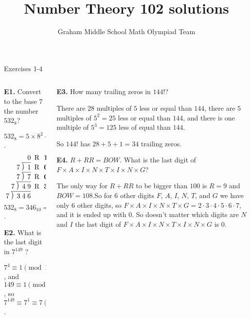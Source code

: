 \documentclass[9pt,aspectratio=169]{beamer}
\title{Number Theory 102 solutions}
\subtitle[Graham Middle School]{Graham Middle School Math Olympiad Team}
\newcommand\Mydiv[2]{%
$\strut#1$\kern.25em\smash{\raise.3ex\hbox{$\big)$}}$\mkern-8mu
        \overline{\enspace\strut#2}$}
\begin{document}
\maketitle

\begin{frame}{Exercises 1-4}
  \begin{columns}[T]
    \begin{column}{0.5\textwidth}
      \begin{problem}
        \textbf{E1.} Convert to the base $7$ the number $532_8$?
      \end{problem}\pause
      $532_8 = 5 \times 8^2 + 3 \times 8 + 2 = 320 + 24 + 2 = 346_{10}$.
      \[
        \setlength\arraycolsep{0.6ex}
        \begin{array}{rl}
          0 & \text{R}\ \ \mathbf{1} \\
          $\Mydiv{7}{\ 1}$ & \text{R}\ \ \mathbf{0} \\
          $\Mydiv{7}{\ 7}$ & \text{R}\ \ \mathbf{0} \\
          $\Mydiv{7}{\ 4\;9}$ & \text{R}\ \ \mathbf{3} \\
          $\Mydiv{7}{\ 3\;4\;6}$ &
        \end{array}
      \]
      $532_8 = 346_{10} = \boxed{1003_{7}}$.\pause
      \begin{problem}
        \textbf{E2.} What is the last digit in $7^{149}$ ?
      \end{problem}\pause
      $7^4 \equiv 1 \pmod{10}$, and $149 \equiv 1 \pmod{4}$, so $7^{149} \equiv 7^{1} \equiv \boxed{7} \pmod{10}$.  \pause
    \end{column}
    \begin{column}{0.5\textwidth}
      \begin{problem}
        \textbf{E3.} How many trailing zeros in $144!$?
      \end{problem}\pause
      There are $28$ multiples of $5$ less or equal than $144$, there are $5$ multiples of $5^2 = 25$ less or equal than $144$, and there is one multiple of $5^3 = 125$ less of equal than $144$. 
      
      So $144!$ has $28 + 5 + 1 = \boxed{34}$ trailing zeros. \pause
      \begin{problem}
        \textbf{E4.} $R + RR = BOW$. What is the last digit of $F \times A \times I \times N \times T \times I \times N \times G$?
      \end{problem}\pause
      The only way for $R + RR$ to be bigger than $100$ is $R = 9$ and $BOW = 108$.\pause So for $6$ other digits $F$, $A$, $I$, $N$, $T$, and $G$ we have only $6$ other digits, so $F \times A \times I \times N \times T \times G = 2 \cdot 3 \cdot 4 \cdot 5 \cdot 6 \cdot 7$, and it is ended up with $0$. So doesn't matter which digits are $N$ and $I$ the last digit of $F \times A \times I \times N \times T \times I \times N \times G$ is $\boxed{0}$.
    \end{column}
  \end{columns}
\end{frame}
\end{document}
